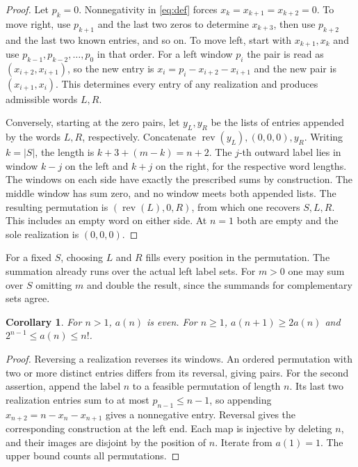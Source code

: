 \documentclass[11pt]{article}
\newtheorem{corollary}[theorem]{Corollary}
\newcommand{\rev}{\operatorname{rev}}
\begin{document}
\begin{proof}
Let \(p_k=0\). Nonnegativity in \eqref{eq:def} forces
\(x_k=x_{k+1}=x_{k+2}=0\). To move right, use \(p_{k+1}\) and the
last two zeros to determine \(x_{k+3}\), then use \(p_{k+2}\) and
the last two known entries, and so on. To move left, start with
\(x_{k+1},x_k\) and use \(p_{k-1},p_{k-2},\ldots,p_0\) in that order.
For a left window \(p_i\) the pair is read as \((x_{i+2},x_{i+1})\),
so the new entry is \(x_i=p_i-x_{i+2}-x_{i+1}\) and the new pair is
\((x_{i+1},x_i)\). This determines every
entry of any realization and produces admissible words \(L,R\).

Conversely, starting at the zero pairs, let \(y_L,y_R\) be the lists
of entries appended by the words \(L,R\), respectively. Concatenate
\(\rev(y_L),(0,0,0),y_R\). Writing \(k=|S|\), the length is \(k+3+(m-k)=n+2\). The
\(j\)-th outward label lies in window \(k-j\) on the left
and \(k+j\) on the right, for the respective word lengths.
The windows on each side have exactly the prescribed sums by construction.
The middle window has sum zero, and no window meets both appended lists.
The resulting permutation is \((\rev(L),0,R)\), from which one recovers
\(S,L,R\). This includes an empty word on either side. At \(n=1\)
both are empty and the sole realization is \((0,0,0)\).
\end{proof}

For a fixed \(S\), choosing \(L\) and \(R\) fills every position in the
permutation. The summation already runs over the actual left label sets.
For \(m>0\) one may sum over \(S\) omitting \(m\) and double the result,
since the summands for complementary sets agree.

\begin{corollary}\label{cor:bounds}
For \(n>1\), \(a(n)\) is even. For \(n\ge1\),
\(a(n+1)\ge2a(n)\) and \(2^{n-1}\le a(n)\le n!\).
\end{corollary}
\begin{proof}
Reversing a realization reverses its windows. An ordered permutation with
two or more distinct entries differs from its reversal, giving pairs.
For the second assertion, append the label \(n\) to a feasible permutation
of length \(n\). Its last two realization entries sum to at most
\(p_{n-1}\le n-1\), so appending \(x_{n+2}=n-x_n-x_{n+1}\) gives a
nonnegative entry. Reversal gives the corresponding construction at the
left end. Each map is injective by deleting \(n\), and their images are
disjoint by the position of \(n\). Iterate from \(a(1)=1\). The upper bound
counts all permutations.
\end{proof}
\end{document}
